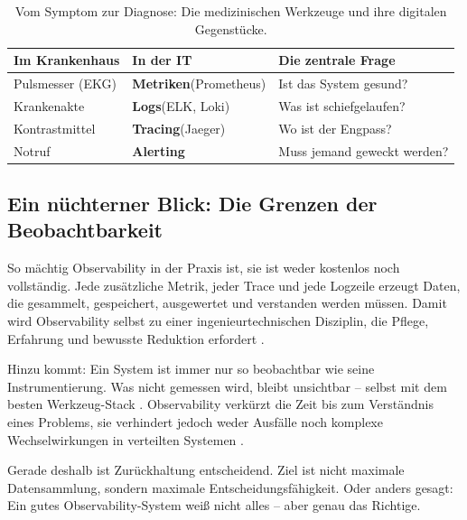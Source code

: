 \begin{table}[h]
\centering
\small
\setlength{\tabcolsep}{5pt}
\renewcommand{\arraystretch}{1.6}
\begin{tabularx}{\columnwidth}{@{}>{\raggedright\arraybackslash}p{} >{\raggedright\arraybackslash}p{} >{\raggedright\arraybackslash}p{}@{}}
\toprule
\textbf{Im Krankenhaus} & \textbf{In der IT} & \textbf{Die zentrale Frage} \\
\midrule
Pulsmesser (EKG) & \textbf{Metriken}\newline(Prometheus) & Ist das System gesund? \\
Krankenakte & \textbf{Logs}\newline(ELK, Loki) & Was ist schiefgelaufen? \\
Kontrastmittel & \textbf{Tracing}\newline(Jaeger) & Wo ist der Engpass? \\
Notruf & \textbf{Alerting} & Muss jemand geweckt werden? \\
\bottomrule
\end{tabularx}
\caption{Vom Symptom zur Diagnose: Die medizinischen Werkzeuge und ihre digitalen Gegenstücke.}
\label{tab:observability-analogy}
\end{table}

\subsection{Ein nüchterner Blick: Die Grenzen der Beobachtbarkeit}

So mächtig Observability in der Praxis ist, sie ist weder kostenlos noch vollständig. Jede zusätzliche Metrik, jeder Trace und jede Logzeile erzeugt Daten, die gesammelt, gespeichert, ausgewertet und verstanden werden müssen. Damit wird Observability selbst zu einer ingenieurtechnischen Disziplin, die Pflege, Erfahrung und bewusste Reduktion erfordert \cite{faseeha2025observability}\cite{giamattei2024monitoring}.

Hinzu kommt: Ein System ist immer nur so beobachtbar wie seine Instrumentierung. Was nicht gemessen wird, bleibt unsichtbar – selbst mit dem besten Werkzeug-Stack \cite{fischer2024microservice}. Observability verkürzt die Zeit bis zum Verständnis eines Problems, sie verhindert jedoch weder Ausfälle noch komplexe Wechselwirkungen in verteilten Systemen \cite{faseeha2025observability}.

Gerade deshalb ist Zurückhaltung entscheidend. Ziel ist nicht maximale Datensammlung, sondern maximale Entscheidungsfähigkeit. Oder anders gesagt: Ein gutes Observability-System weiß nicht alles – aber genau das Richtige.



